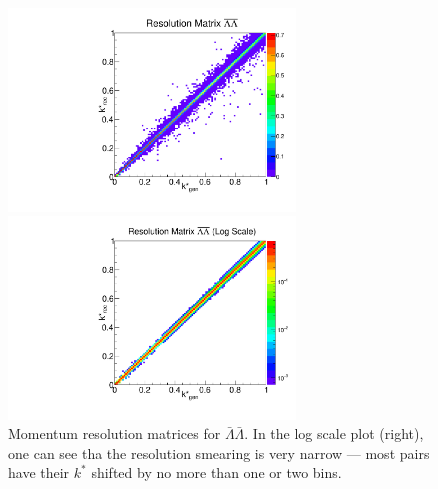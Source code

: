 \begin{figure}[h]
\begin{minipage}{18pc}
\includegraphics[width=18pc]{Figures/2016-07-19-ResMatrixAntiLambdaAntiLambda.pdf}
\end{minipage}\hspace{2pc}
\begin{minipage}{18pc}
\includegraphics[width=18pc]{Figures/2016-07-19-ResMatrixAntiLambdaAntiLambdaLog.pdf}
\end{minipage} 
\caption[Momentum resolution matrices -- $\bar{\Lambda}\bar{\Lambda}$]{\label{fig:MomResAA} Momentum resolution matrices for $\bar{\Lambda}\bar{\Lambda}$. In the log scale plot (right), one can see tha the resolution smearing is very narrow --- most pairs have their $k^*$ shifted by no more than one or two bins.}
\end{figure}

